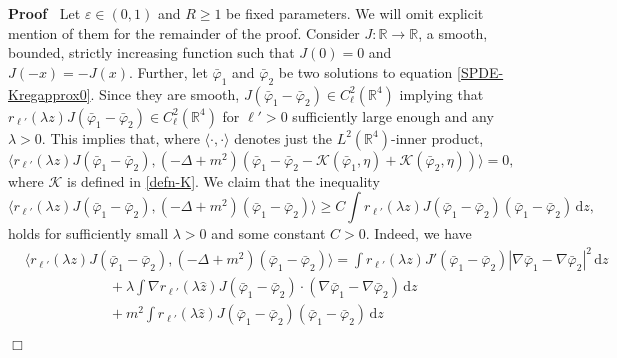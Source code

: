 \documentclass{article}
\newcommand{\mathd}{\mathrm{d}}
\newenvironment{proof}{\noindent\textbf{Proof\ }}{\hspace*{\fill}$\Box$\medskip}
\begin{document}
\begin{proof}
  Let $\varepsilon \in (0, 1)$ and $R \geqslant 1$ be fixed parameters. We will omit explicit mention of them for the remainder of the proof. Consider $J : \mathbb{R} \rightarrow \mathbb{R}$,  a smooth, bounded, strictly increasing function
  such that $J (0) = 0$ and $J (- x) = - J (x)$. Further, let
  $\bar{\varphi}_1$ and $\bar{\varphi}_2$ be two solutions to equation   \eqref{SPDE-Kregapprox0}. Since they are smooth, $J (\bar{\varphi}_1 -
  \bar{\varphi}_2) \in C_{\ell}^2 (\mathbb{R}^4)$ implying that
  $r_{\ell'} (\lambda z) J (\bar{\varphi}_1 - \bar{\varphi}_2) \in
  C_{\ell}^2 (\mathbb{R}^4)$ for $\ell' > 0$ sufficiently large enough and any $\lambda > 0$. This implies that, where $\langle \cdot, \cdot \rangle$ denotes
  just the $L^2 (\mathbb{R}^4)$-inner product,
  \[ \langle r_{\ell'} (\lambda z) J (\bar{\varphi}_1 - \bar{\varphi}_2), (-
     \Delta + m^2) (\bar{\varphi}_1 - \bar{\varphi}_2
     -\mathcal{K}(\bar{\varphi}_1, \eta) +\mathcal{K}(\bar{\varphi}_2, \eta))
     \rangle = 0, \]
  where $\mathcal{K}$ is defined in \eqref{defn-K}. 
  We claim that the inequality
  \begin{equation}
      \langle r_{\ell'} (\lambda z) J (\bar{\varphi}_1 - \bar{\varphi}_2), (-
      \Delta + m^2) (\bar{\varphi}_1 - \bar{\varphi}_2) \rangle \geqslant C
      \int r_{\ell'} (\lambda z) J (\bar{\varphi}_1 - \bar{\varphi}_2)
      (\bar{\varphi}_1 - \bar{\varphi}_2) \, \mathd z,
    \label{eq:inequalityuniqueness}
  \end{equation}
  holds for sufficiently small $\lambda > 0$ and some constant $C > 0$. Indeed, we have
    \begin{align*}
        & \langle r_{\ell'} (\lambda z) J (\bar{\varphi}_1 - \bar{\varphi}_2), (-
       \Delta + m^2) (\bar{\varphi}_1 - \bar{\varphi}_2) \rangle  = \int r_{\ell'} (\lambda z) J' (\bar{\varphi}_1 -
       \bar{\varphi}_2) | \nabla \bar{\varphi}_1 - \nabla \bar{\varphi}_2 |^2
       \, \mathd z \\
       & \qquad \hspace{4em} + \lambda \int \nabla r_{\ell'} (\lambda \hat{z}) J
       (\bar{\varphi}_1 - \bar{\varphi}_2) \cdot (\nabla \bar{\varphi}_1 -
       \nabla \bar{\varphi}_2) \, \mathd z\\
       & \qquad \hspace{4em} + m^2  \int r_{\ell'} (\lambda \hat{z}) J
       (\bar{\varphi}_1 - \bar{\varphi}_2) (\bar{\varphi}_1 - \bar{\varphi}_2)\,       \mathd z\\

\end{align*}
\end{proof}
\end{document}
